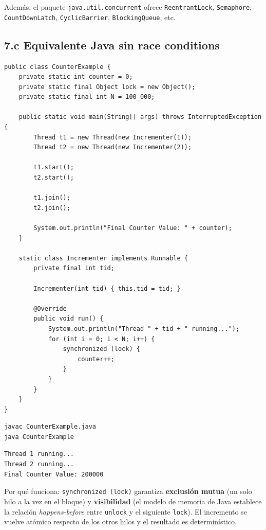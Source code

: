 \documentclass[11pt,a4paper]{article}
\begin{document}
Además, el paquete \texttt{java.util.concurrent} ofrece
\texttt{ReentrantLock}, \texttt{Semaphore}, \texttt{CountDownLatch},
\texttt{CyclicBarrier}, \texttt{BlockingQueue}, etc.

\subsection*{7.c Equivalente Java sin race conditions}

\begin{lstlisting}[style=javastyle]
public class CounterExample {
    private static int counter = 0;
    private static final Object lock = new Object();
    private static final int N = 100_000;

    public static void main(String[] args) throws InterruptedException {
        Thread t1 = new Thread(new Incrementer(1));
        Thread t2 = new Thread(new Incrementer(2));

        t1.start();
        t2.start();

        t1.join();
        t2.join();

        System.out.println("Final Counter Value: " + counter);
    }

    static class Incrementer implements Runnable {
        private final int tid;

        Incrementer(int tid) { this.tid = tid; }

        @Override
        public void run() {
            System.out.println("Thread " + tid + " running...");
            for (int i = 0; i < N; i++) {
                synchronized (lock) {
                    counter++;
                }
            }
        }
    }
}
\end{lstlisting}

\begin{lstlisting}
javac CounterExample.java
java CounterExample
\end{lstlisting}

\begin{lstlisting}[style=textstyle]
Thread 1 running...
Thread 2 running...
Final Counter Value: 200000
\end{lstlisting}

Por qué funciona: \texttt{synchronized (lock)} garantiza
\textbf{exclusión mutua} (un solo hilo a la vez en el bloque) y
\textbf{visibilidad} (el modelo de memoria de Java establece la relación
\emph{happens-before} entre \texttt{unlock} y el siguiente \texttt{lock}).
El incremento se vuelve atómico respecto de los otros hilos y el
resultado es determinístico.
\end{document}
